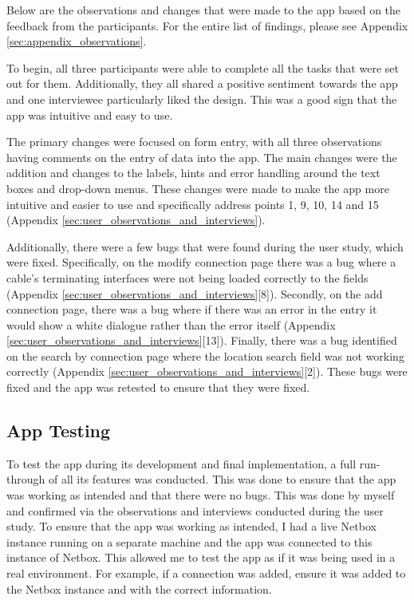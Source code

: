 \documentclass [11pt,a4paper]{article}
\begin{document}
Below are the observations and changes that were made to the app based on the feedback from the participants. For the entire list of findings, please see Appendix \ref{sec:appendix_observations}. 

To begin, all three participants were able to complete all the tasks that were set out for them. Additionally, they all shared a positive sentiment towards the app and one interviewee particularly liked the design. This was a good sign that the app was intuitive and easy to use.

The primary changes were focused on form entry, with all three observations having comments on the entry of data into the app. The main changes were the addition and changes to the labels, hints and error handling around the text boxes and drop-down menus. These changes were made to make the app more intuitive and easier to use and specifically address points 1, 9, 10, 14 and 15 (Appendix \ref{sec:user_observations_and_interviews}). 

Additionally, there were a few bugs that were found during the user study, which were fixed. Specifically, on the modify connection page there was a bug where a cable's terminating interfaces were not being loaded correctly to the fields (Appendix \ref{sec:user_observations_and_interviews}[8]). Secondly, on the add connection page, there was a bug where if there was an error in the entry it would show a white dialogue rather than the error itself (Appendix \ref{sec:user_observations_and_interviews}[13]). Finally, there was a bug identified on the search by connection page where the location search field was not working correctly (Appendix \ref{sec:user_observations_and_interviews}[2]). These bugs were fixed and the app was retested to ensure that they were fixed.


\subsection{App Testing}
\label{sec:eval_app_testing}
To test the app during its development and final implementation, a full run-through of all its features was conducted. This was done to ensure that the app was working as intended and that there were no bugs. This was done by myself and confirmed via the observations and interviews conducted during the user study. To ensure that the app was working as intended, I had a live Netbox instance running on a separate machine and the app was connected to this instance of Netbox. This allowed me to test the app as if it was being used in a real environment. For example, if a connection was added, ensure it was added to the Netbox instance and with the correct information. 
\end{document}
